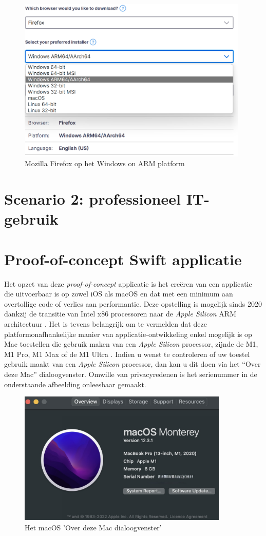 \begin{figure}[!h]
	\centering
	\includegraphics[width=110mm, scale=0.7]{img/firefox_winARM.png}
	\caption{Mozilla Firefox op het Windows on ARM platform \autocite{Mozilla2022}}
\end{figure}

\pagebreak
\section{Scenario 2: professioneel IT-gebruik}
\lipsum[1-4]

\pagebreak
\section{Proof-of-concept Swift applicatie}
Het opzet van deze \textit{proof-of-concept} applicatie is het creëren van een applicatie die uitvoerbaar is op zowel iOS als macOS en dat met een minimum aan overtollige code of verlies aan performantie. Deze opstelling is mogelijk sinds 2020 dankzij de transitie van Intel x86 processoren naar de \textit{Apple Silicon} ARM architectuur \autocite{Apple2020}. Het is tevens belangrijk om te vermelden dat deze platformonafhankelijke manier van applicatie-ontwikkeling enkel mogelijk is op Mac toestellen die gebruik maken van een \textit{Apple Silicon} processor, zijnde de M1, M1 Pro, M1 Max of de M1 Ultra \autocite{AppleDeveloper2022a}. Indien u wenst te controleren of uw toestel gebruik maakt van een \textit{Apple Silicon} processor, dan kan u dit doen via het “Over deze Mac” dialoogvenster. Omwille van privacyredenen is het serienummer in de onderstaande afbeelding onleesbaar gemaakt.

\begin{figure}[h]
    \centering
    \includegraphics[width=100mm, scale=0.5]{img/overdezemac.jpeg}
    \caption{Het macOS 'Over deze Mac dialoogvenster'}
\end{figure}

